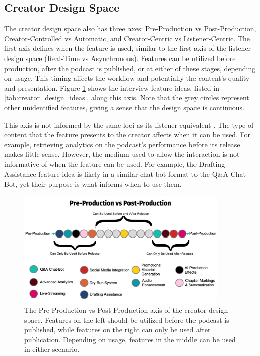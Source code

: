 \documentclass[12pt]{report}
\begin{document}
\begin{myfont}
        \subsection{Creator Design Space}
        \indent The creator design space also has three axes: Pre-Production vs Post-Production, Creator-Controlled vs Automatic, and Creator-Centric vs Listener-Centric. The first axis defines when the feature is used, similar to the first axis of the listener design space (Real-Time vs Asynchronous). Features can be utilized before production, after the podcast is published, or at either of these stages, depending on usage. This timing affects the workflow and potentially the content's quality and presentation. Figure \ref{fig:preprodvspostprod} shows the interview feature ideas, listed in \ref{tab:creator_design_ideas}, along this axis. Note that the grey circles represent other unidentified features, giving a sense that the design space is continuous. 
        
        This axis is not informed by the same loci as its listener equivalent \citep{Sundar2010Designing}. The type of content that the feature presents to the creator affects when it can be used. For example, retrieving analytics on the podcast's performance before its release makes little sense. However, the medium used to allow the interaction is not informative of when the feature can be used. For example, the Drafting Assistance feature idea is likely in a similar chat-bot format to the Q\&A Chat-Bot, yet their purpose is what informs when to use them.

        \begin{figure}[H]
            \centering
              \includegraphics[width=0.9\textwidth]{figures/preprodvspostprod.png}
              \caption{The Pre-Production vs Post-Production axis of the creator design space. Features on the left should be utilized before the podcast is published, while features on the right can only be used after publication. Depending on usage, features in the middle can be used in either scenario.}
              \label{fig:preprodvspostprod}
        \end{figure}
        

\end{myfont}
\end{document}
